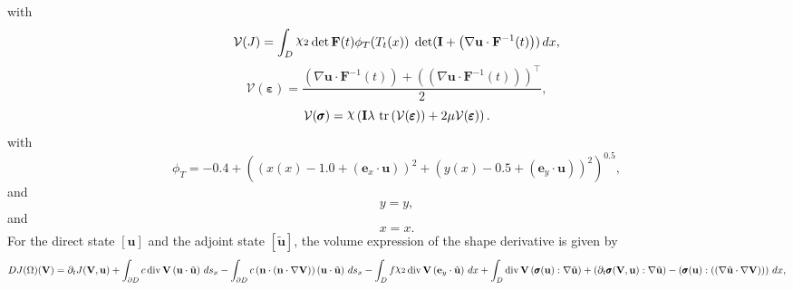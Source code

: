 \documentclass[preview]{standalone}
\let\oldcdot\cdot
\let\cdot\oldcdot
\begin{document}
with
\begin{dmath*}
\mathcal V(J) =  \int_{D} \raisebox{\depth}{$\chi_2$}  \operatorname{det}\mathbf F( t )  \phi_{T}(T_t(x))  \;\operatorname{det}(\mathbf{I} + \left(  \nabla {\mathbf{ u }}  \cdot  \mathbf F^{-1}(t) \right))  \,dx,
 \end{dmath*}
\begin{dmath*}
\mathcal V(\pmb \varepsilon) = \frac{\left(  \nabla {\mathbf{ u }}  \cdot  \mathbf F^{-1}(t) \right) +  \left( \left(  \nabla {\mathbf{ u }}  \cdot  \mathbf F^{-1}(t) \right) \right)^\top }{2},
 \end{dmath*}
\begin{dmath*}
\mathcal V(\pmb \sigma) = \raisebox{\depth}{$\chi$} \left(\mathbf{I} \lambda  \,\operatorname{tr}\left(\mathcal V(\pmb \varepsilon)\right)  + 2 \mu \mathcal V(\pmb \varepsilon)\right).
 \end{dmath*}
with 
\begin{dmath*}
\phi_{T} = -0.4 + \left(\left(x(x) - 1.0 + \left( \mathbf e_x \cdot {\mathbf{ u }} \right)\right)^{2} + \left(y(x) - 0.5 + \left( \mathbf e_y \cdot {\mathbf{ u }} \right)\right)^{2}\right)^{0.5},\end{dmath*}
and\begin{dmath*}
y = y,\end{dmath*}
and\begin{dmath*}
x = x.\end{dmath*}
For the direct state $\left[ {\mathbf{ u }}\right]$ and the adjoint state $\left[ \tilde{\mathbf{ u }}\right]$, the volume expression of the shape derivative is given by
\begin{dmath*}
DJ(\Omega)(\mathbf V) = \partial_{t} J({\mathbf V},{\mathbf{ u }}) +  \int_{\partial D} c \operatorname{div} {\mathbf V} \left( {\mathbf{ u }} \cdot \tilde{\mathbf{ u }} \right) \,ds_x -  \int_{\partial D} c \left( \mathbf n \cdot \left( \mathbf n \cdot  \nabla {\mathbf V}  \right) \right) \left( {\mathbf{ u }} \cdot \tilde{\mathbf{ u }} \right) \,ds_x -  \int_{D} f \raisebox{\depth}{$\chi_2$} \operatorname{div} {\mathbf V} \left( \mathbf e_y \cdot \tilde{\mathbf{ u }} \right) \,dx +  \int_{D} \operatorname{div} {\mathbf V} \left( \pmb \sigma({\mathbf{ u }}) \mathrel{:}  \nabla \tilde{\mathbf{ u }}  \right) + \left( \partial_{t} \pmb \sigma({\mathbf V},{\mathbf{ u }}) \mathrel{:}  \nabla \tilde{\mathbf{ u }}  \right) - \left( \pmb \sigma({\mathbf{ u }}) \mathrel{:} \left( \left(  \nabla \tilde{\mathbf{ u }}  \cdot  \nabla {\mathbf V}  \right) \right)\right) \,dx , 
\end{dmath*}
\end{document}
